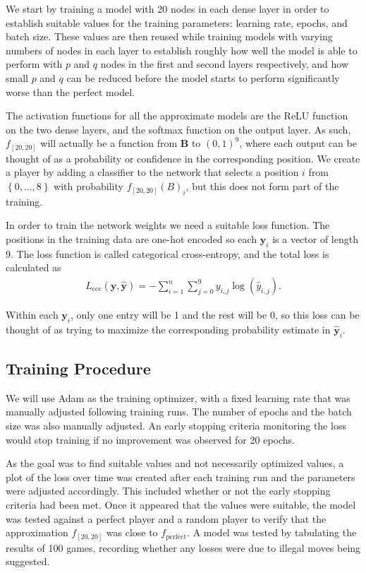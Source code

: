 \documentclass{somasmsc}
\begin{document}
We start by training a model with 20 nodes in each dense layer in order to establish suitable values for the training parameters: learning rate, epochs, and batch size. These values are then reused while training models with varying numbers of nodes in each layer to establish roughly how well the model is able to perform with $p$ and $q$ nodes in the first and second layers respectively, and how small $p$ and $q$ can be reduced before the model starts to perform significantly worse than the perfect model.

The activation functions for all the approximate models are the ReLU function on the two dense layers, and the softmax function on the output layer. As such, $f_{\left[20,20\right]}$ will actually be a function from $\mathbf{B}$ to $\left(0, 1\right)^9$, where each output can be thought of as a probability or confidence in the corresponding position. We create a player by adding a classifier to the network that selects a position $i$ from $\left\{0, \dots, 8\right\}$ with probability $f_{\left[20,20\right]}\left(B\right)_i$, but this does not form part of the training.

In order to train the network weights we need a suitable loss function. The positions in the training data are one-hot encoded so each $\pmb{y}_i$ is a vector of length 9. The loss function is called categorical cross-entropy, and the total loss is calculated as
\begin{align*}
   L_{\text{cce}}\left(\pmb{y},\hat{\pmb{y}}\right) = - \sum_{i=1}^n \sum_{j=0}^9 y_{i,j} \log\left(\hat{y}_{i,j}\right).
\end{align*}

Within each $\pmb{y}_i$, only one entry will be 1 and the rest will be 0, so this loss can be thought of as trying to maximize the corresponding probability estimate in $\hat{\pmb{y}}_i$.

\subsection{Training Procedure}\label{ox:train}

We will use Adam as the training optimizer, with a fixed learning rate that was manually adjusted following training runs. The number of epochs and the batch size was also manually adjusted. An early stopping criteria monitoring the loss would stop training if no improvement was observed for 20 epochs.

As the goal was to find suitable values and not necessarily optimized values, a plot of the loss over time was created after each training run and the parameters were adjusted accordingly. This included whether or not the early stopping criteria had been met. Once it appeared that the values were suitable, the model was tested against a perfect player and a random player to verify that the approximation $f_{\left[20,20\right]}$ was close to $f_{\text{perfect}}$. A model was tested by tabulating the results of 100 games, recording whether any losses were due to illegal moves being suggested.
\end{document}
